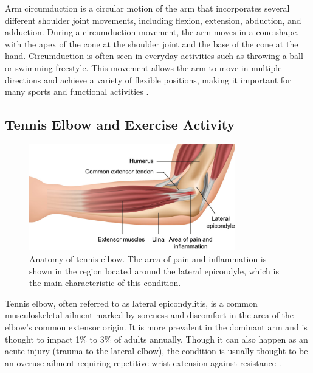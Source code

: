 Arm circumduction is a circular motion of the arm that incorporates several different shoulder joint movements, including flexion, extension, abduction, and adduction. During a circumduction movement, the arm moves in a cone shape, with the apex of the cone at the shoulder joint and the base of the cone at the hand. Circumduction is often seen in everyday activities such as throwing a ball or swimming freestyle. This movement allows the arm to move in multiple directions and achieve a variety of flexible positions, making it important for many sports and functional activities \cite{ArmCircumduction}.

\subsection{Tennis Elbow and Exercise Activity}
\label{subsec2:TennisElbow}

\begin{figure}[h!]
    \centering
    \includegraphics[width=0.8\textwidth]{bab2/ar_TennisElbow.png}
    \caption{Anatomy of tennis elbow. The area of pain and inflammation is shown in the region located around the lateral epicondyle, which is the main characteristic of this condition.}
    \label{fig:TennisElbow}
\end{figure}

Tennis elbow, often referred to as lateral epicondylitis, is a common musculoskeletal ailment marked by soreness and discomfort in the area of the elbow's common extensor origin. It is more prevalent in the dominant arm and is thought to impact 1\% to 3\% of adults annually. Though it can also happen as an acute injury (trauma to the lateral elbow), the condition is usually thought to be an overuse ailment requiring repetitive wrist extension against resistance \cite{TennisElbow1}.

